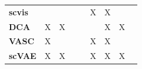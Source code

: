 \begin{table}
{\begin{small}
\begin{tabular}{lcccccccc}
\textbf{scvis}           &                  &                                                                       &                       &                                                                   & X                                                                   & X                                                                            &                     &                                                                            \\[0.2cm]
\textbf{DCA}             & X                & X                                                                     &                       &                                                                   &                                                                     & X                                                                            & X                   &                                                                            \\[0.2cm]
\textbf{VASC}            & X                &                                                                       &                       &                                                                   & X                                                                   & X                                                                            &                     &                                                                            \\[0.2cm]
\textbf{scVAE}           & X                & X                                                                     &                       &                                                                   & X                                                                   & X                                                                            & X                   &                                                                    \\[0.2cm]



\end{tabular}
\end{small}}
\end{table}
